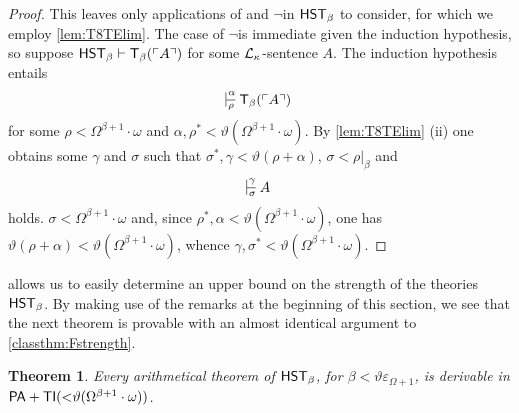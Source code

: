 \documentclass[UKenglish,cleveref,DIV=12]{scrartcl}
\newtheorem{theorem}{Theorem}
\newtheorem{corollary}[lemma]{Corollary}
\theoremstyle{definition}
\theoremstyle{definition}
\begin{document}
\begin{proof}
This leaves only applications of \Conec\beta and $\lnot$\Conec\beta in
$\mathsf{HST}_\beta$ to consider, for which we employ \cref{lem:T8TElim}. The case of $\lnot$\Conec\beta is immediate given the induction hypothesis, so suppose
$\mathsf{HST}_\beta\vdash \mathsf{T}_\beta(\ulcorner{A}\urcorner)$
for some $\mathcal{L}_\kappa$-sentence $A$. The induction hypothesis entails
\begin{align}\label{eqn:T8embed5}
  \prov\alpha\rho{\T_\beta(\gn A)}
\end{align}
for some $\rho<\Omega^{\beta+1}\cdot\omega$ and $\alpha,\rho^*<
\vartheta(\Omega^{\beta+1}\cdot\omega)$. By \cref{lem:T8TElim} (ii) one
obtains some $\gamma$ and $\sigma$ such that $\sigma^*,\gamma<\vartheta(\rho+\alpha)$, $\sigma<\rho|_\beta$ and
\begin{align*}
  \prov\gamma\sigma{A}
\end{align*}
holds. $\sigma<\Omega^{\beta+1}\cdot\omega$ and, since
$\rho^*,\alpha<\vartheta(\Omega^{\beta+1}\cdot\omega)$, one has
$\vartheta(\rho+\alpha)<\vartheta(\Omega^{\beta+1}\cdot\omega)$, whence
$\gamma,\sigma^*<\vartheta(\Omega^{\beta+1}\cdot\omega)$.
\end{proof}
 allows us to easily determine an upper bound on the strength of the theories $\mathsf{HST}_\beta$. By making use of the remarks at the beginning of this section, we see that the next theorem is provable with an almost identical argument to \cref{classthm:Fstrength}.
\begin{theorem}\label{thm:FbetaupperbdI}
 Every arithmetical theorem of $\mathsf{HST}_\beta$, for $\beta<\vartheta\varepsilon_{\Omega+1}$, is derivable in
$\mathsf{PA}+\mathsf{TI}(\mathord<\vartheta(\Omega^{\beta+1}\cdot\omega))$.
\end{theorem}
%
\end{document}
